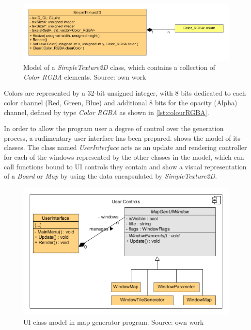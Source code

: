 \documentclass[12pt]{report}
\begin{document}
\begin{figure}[H]
	\centering
	\includegraphics[width=0.9\linewidth]{diagrams/texture}
	\caption{Model of a \textit{SimpleTexture2D} class, which contains a collection of \textit{Color RGBA} elements. Source: own work}
	\label{fig:texture}
\end{figure}

Colors are represented by a 32-bit unsigned integer, with 8 bits dedicated to each color channel (Red, Green, Blue) and additional 8 bits for the opacity (Alpha) channel, defined by type \textit{Color RGBA} as shown in \cref{lst:colourRGBA}. 



In order to allow the program user a degree of control over the generation process, a rudimentary user interface has been prepared.  shows the model of its classes. The class named \textit{UserInterface} acts as an update and rendering controller for each of the windows represented by the other classes in the model, which can call functions bound to UI controls they contain and show a visual representation of a \textit{Board} or \textit{Map} by using the data encapsulated by \textit{SimpleTexture2D}.

\begin{figure}[H]
	\centering
	\includegraphics[width=0.8\linewidth]{diagrams/uiwindows}
	\caption[User Interface model]{UI class model in map generator program. Source: own work}
	\label{fig:uiwindows}
\end{figure}
\end{document}

